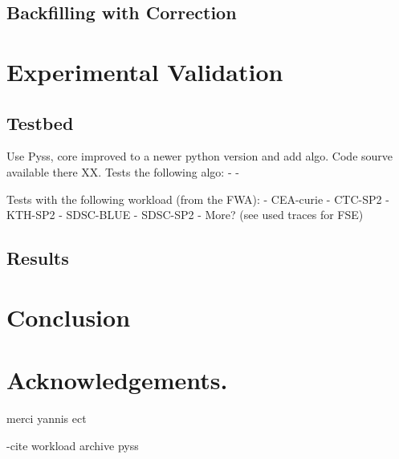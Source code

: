 \documentclass{llncs}
\begin{document}
\subsection{Backfilling with Correction}
\label{sub:backfilling_with_correction}





\section{Experimental Validation}
\label{sec:experimental_validation}

\subsection{Testbed}
\label{sub:Testbed}
Use Pyss, core improved to a newer python version and add algo. Code sourve available there XX.
Tests the following algo:
- 
- 

Tests with the following workload (from the FWA):
- CEA-curie
- CTC-SP2
- KTH-SP2
- SDSC-BLUE
- SDSC-SP2
- More? (see used traces for FSE)


\subsection{Results}
\label{sub:Testbed}




\section{Conclusion}
\label{sec:conclusion}





\section*{Acknowledgements.}
\label{sec:ack}
merci yannis ect

-cite
workload archive
pyss




\end{document}
